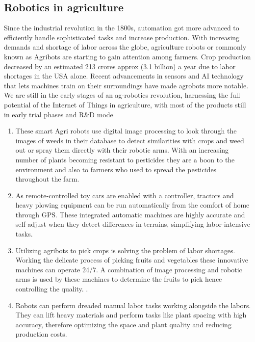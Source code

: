 \documentclass{report}
\begin{document}
    
\begin{multicols}{1}    
    \section*{Robotics in agriculture}
    
Since the industrial revolution in the 1800s, automation got more advanced to
efficiently handle sophisticated tasks and increase production. With increasing
demands and shortage of labor across the globe, agriculture robots or commonly
known as Agribots are starting to gain attention among farmers. Crop production
decreased by an estimated 213 crores approx (3.1 billion) a year due to labor
shortages in the USA alone. Recent advancements in sensors and AI technology that
lets machines train on their surroundings have made agrobots more notable. We are
still in the early stages of an ag-robotics revolution, harnessing the full potential of
the Internet of Things in agriculture, with most of the products still in early trial phases
and R&D mode
    
    \begin{enumerate}
        \item These smart Agri robots use digital image processing to look through the images of
weeds in their database to detect similarities with crops and weed out or spray them
directly with their robotic arms. With an increasing number of plants becoming
resistant to pesticides they are a boon to the environment and also to farmers who
used to spread the pesticides throughout the farm. 
        \item As remote-controlled toy cars are enabled with a controller, tractors and heavy
plowing equipment can be run automatically from the comfort of home through GPS.
These integrated automatic machines are highly accurate and self-adjust when they
detect differences in terrains, simplifying labor-intensive tasks.
        \item Utilizing agribots to pick crops is solving the problem of labor shortages. Working the
delicate process of picking fruits and vegetables these innovative machines can
operate 24/7. A combination of image processing and robotic arms is used by these
machines to determine the fruits to pick hence controlling the quality. .
        \item Robots can perform dreaded manual labor tasks working alongside the labors. They
can lift heavy materials and perform tasks like plant spacing with high accuracy,
therefore optimizing the space and plant quality and reducing production costs.
    \end{enumerate}
    


\end{multicols}
\end{document}
